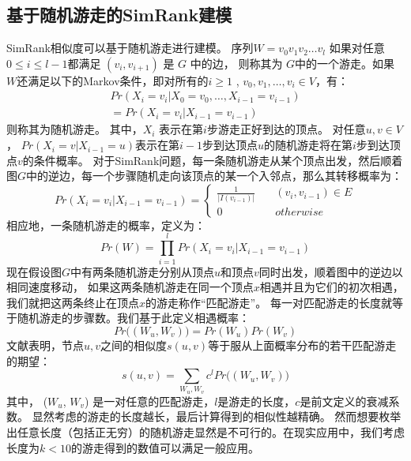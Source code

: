 \documentclass[master]{njuthesis}
\begin{document}
\subsection{基于随机游走的SimRank建模}
SimRank相似度可以基于随机游走进行建模。
序列$W=v_0v_1v_2\dots v_l$ 如果对任意$0 \leq i \leq l-1$都满足 $(v_i, v_{i+1})$ 是 $G$ 中的边，
则称其为 $G$中的一个游走。如果$W$还满足以下的Markov条件，即对所有的$i \geq1$ ,   $v_0, v_1, \dots, v_i \in V$，有：
\begin{eqnarray}
\label{eq:three}
  Pr(X_i = v_i|X_{0} = v_{0},\dots, X_{i-1}  = v_{i-1}) \nonumber \\  
 =  Pr(X_i = v_i|X_{i-1} = v_{i-1})
\end{eqnarray}
则称其为随机游走。
其中，$X_i$ 表示在第$i$步游走正好到达的顶点。
对任意$ u,v \in V$， $Pr(X_i=v|X_{i-1}=u)$表示在第$i-1$步到达顶点$u$的随机游走将在第$i$步到达顶点$v$的条件概率。
对于SimRank问题，每一条随机游走从某个顶点出发，然后顺着图$G$中的逆边，每一个步骤随机走向该顶点的某一个入邻点，那么其转移概率为：
\begin{equation}
Pr(X_i=v_i|X_{i-1}=v_{i-1}) = \left\{
        \begin{array}{ll}
	\frac{1}{|I(v_{i-1})|} & \quad (v_i, v_{i-1}) \in E \\
	0  &\quad otherwise
        \end{array}
    \right.
	\label{eq:four}
\end{equation}
相应地，一条随机游走的概率，定义为：
 \begin{equation}
Pr(W) = \prod_{i=1}^{l}Pr(X_i=v_i|X_{i-1}=v_{i-1})
	\label{eq:seven}
\end{equation}
现在假设图$G$中有两条随机游走分别从顶点$u$和顶点$v$同时出发，顺着图中的逆边以相同速度移动，
如果这两条随机游走在同一个顶点$x$相遇并且为它们的初次相遇，我们就把这两条终止在顶点$x$的游走称作“匹配游走”。
每一对匹配游走的长度就等于随机游走的步骤数。我们基于此定义相遇概率：
 \begin{equation}
Pr\big((W_u, W_v)\big) = Pr(W_u)Pr(W_v)
	\label{eq:five}
\end{equation}
文献\cite{jeh2002simrank}表明，节点$u,v$之间的相似度$s(u,v)$等于服从上面概率分布的若干匹配游走的期望：
 \begin{equation}
s(u,v) = \sum\limits_{W_u, W_v} c^lPr\big((W_u, W_v)\big)
	\label{eq:six}
\end{equation}
其中， ($W_u$, $W_v$) 是一对任意的匹配游走，$l$是游走的长度，$c$是前文定义的衰减系数。
显然考虑的游走的长度越长，最后计算得到的相似性越精确。
然而想要枚举出任意长度（包括正无穷）的随机游走显然是不可行的。在现实应用中，我们考虑长度为$k < 10$的游走得到的数值可以满足一般应用。
\end{document}
